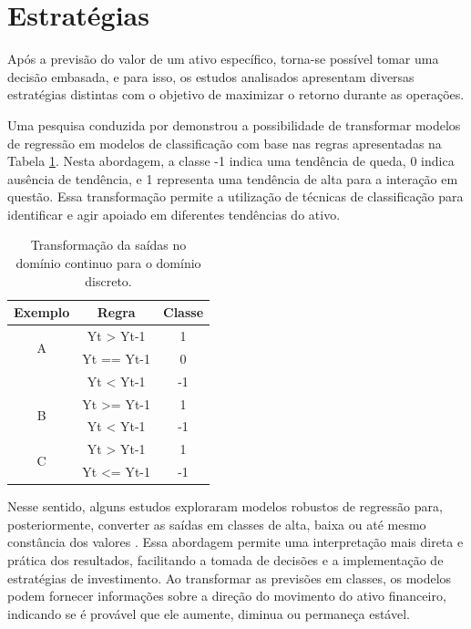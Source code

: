 \section{Estratégias}
\label{subsec:estrategias}

Após a previsão do valor de um ativo específico, torna-se possível tomar uma decisão embasada, e para isso, os estudos analisados apresentam diversas estratégias distintas com o objetivo de maximizar o retorno durante as operações. 

Uma pesquisa conduzida por  demonstrou a possibilidade de transformar modelos de regressão em modelos de classificação com base nas regras apresentadas na Tabela \ref{tab:RegraTransf}. Nesta abordagem, a classe -1 indica uma tendência de queda, 0 indica ausência de tendência, e 1 representa uma tendência de alta para a interação em questão. 
Essa transformação permite a utilização de técnicas de classificação para identificar e agir apoiado em diferentes tendências do ativo.

\begin{table}[h]
\begin{center}
\begin{tabular}{ccc}
\hline
Exemplo            & Regra                   & Classe \\ \hline
\multirow{2}{*}{A} & Yt > Yt-1    & 1      \\
             & Yt == Yt-1              & 0      \\
             & Yt < Yt-1       & -1     \\ \hline
\multirow{2}{*}{B} & Yt >= Yt-1 & 1      \\
             & Yt < Yt-1       & -1     \\ \hline
\multirow{2}{*}{C} & Yt > Yt-1    & 1      \\
             & Yt <= Yt-1    & -1     \\ \hline
\end{tabular}
\end{center}
\caption{Transformação da saídas no domínio continuo para o domínio discreto.}
\label{tab:RegraTransf}
\end{table}

Nesse sentido, alguns estudos exploraram modelos robustos de regressão para, posteriormente, converter as saídas em classes de alta, baixa ou até mesmo constância dos valores \cite{ampomah2020evaluation, jiang2020improved, Xiaoci_Predicting}. Essa abordagem permite uma interpretação mais direta e prática dos resultados, facilitando a tomada de decisões e a implementação de estratégias de investimento. Ao transformar as previsões em classes, os modelos podem fornecer informações sobre a direção do movimento do ativo financeiro, indicando se é provável que ele aumente, diminua ou permaneça estável. 

